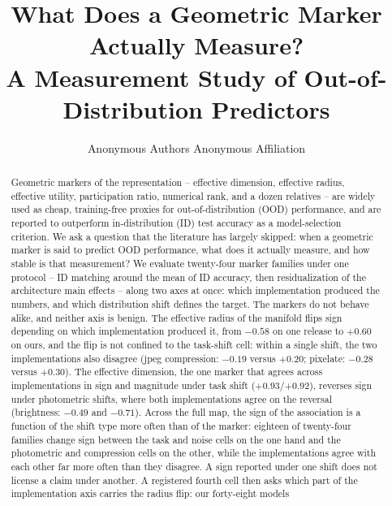\documentclass[10pt]{article}
\title{What Does a Geometric Marker Actually Measure?\\ A Measurement Study of Out-of-Distribution Predictors}
\author{\name Anonymous Authors \AND \addr Anonymous Affiliation}
\begin{document}
\maketitle

\let\thefootnote\relax{}

\begin{abstract}
Geometric markers of the representation -- effective dimension, effective radius,
effective utility, participation ratio, numerical rank, and a dozen relatives --
are widely used as cheap, training-free proxies for out-of-distribution (OOD)
performance, and are reported to outperform in-distribution (ID) test accuracy
as a model-selection criterion. We ask a question that the literature has
largely skipped: when a geometric marker is said to predict OOD performance,
what does it actually measure, and how stable is that measurement? We evaluate
twenty-four marker families under one protocol -- ID matching around the mean of
ID accuracy, then residualization of the architecture main effects -- along two
axes at once: which implementation produced the numbers, and which distribution
shift defines the target. The markers do not behave alike, and neither axis is
benign. The effective radius of the manifold flips sign depending on which
implementation produced it, from $-0.58$ on one release to $+0.60$ on ours, and
the flip is not confined to the task-shift cell: within a single shift, the two
implementations also disagree (jpeg compression: $-0.19$ versus $+0.20$;
pixelate: $-0.28$ versus $+0.30$). The effective dimension, the one marker that
agrees across implementations in sign and magnitude under task shift
($+0.93$/$+0.92$), reverses sign under photometric shifts, where both
implementations agree on the reversal (brightness: $-0.49$ and $-0.71$). Across
the full map, the sign of the association is a function of the shift type more
often than of the marker: eighteen of twenty-four families change sign between
the task and noise cells on the one hand and the photometric and compression
cells on the other, while the implementations agree with each other far more
often than they disagree. A sign reported under one shift does not license a
claim under another. A registered fourth cell then asks which part of the
implementation axis carries the radius flip: our forty-eight models

\end{abstract}
\end{document}

